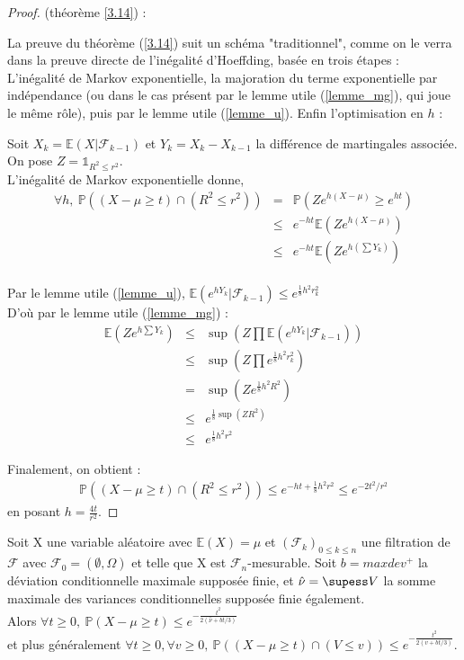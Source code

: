 \begin{proof} (théorème \ref{3.14}) :

La preuve du théorème (\ref{3.14}) suit un schéma "traditionnel", comme on le verra dans la preuve directe de l'inégalité d'Hoeffding, basée en trois étapes : L'inégalité de Markov exponentielle, la majoration du terme exponentielle par indépendance (ou dans le cas présent par le lemme utile (\ref{lemme_mg}), qui joue le même rôle), puis par le lemme utile (\ref{lemme_u}). Enfin l'optimisation en $h$ : 

Soit $X_k=\mathbb{E}(X|\mathcal{F}_{k-1})$ et $Y_k=X_k-X_{k-1}$ la différence de martingales associée.
On pose $  Z=\mathds{1}_{R^2 \leq r^2}  $. \\
L'inégalité de Markov exponentielle donne,
 \begin{eqnarray*} \forall h, ~
\mathbb{P}((X-\mu \geq t)\cap(R^2 \leq r^2)) 
 &=& \mathbb{P}(Ze^{h(X-\mu)} \geq e^{ht})\\
 &\leq& e^{-ht}\mathbb{E}(Ze^{h(X-\mu)})\\
 &\leq& e^{-ht}\mathbb{E}(Ze^{h(\sum Y_k)}) 
 \end{eqnarray*}
\\ 

Par le lemme utile (\ref{lemme_u}), 
$ \mathbb{E}(e^{hY_k}|\mathcal{F}_{k-1}) \leq e^{\frac{1}{8}h^2r_k^2}$ \\
D'où par le lemme utile (\ref{lemme_mg})  :
\begin{eqnarray*}
 \mathbb{E}(Ze^{h\sum Y_k}) &\leq& \sup(Z \prod \mathbb{E}(e^{hY_k}|\mathcal{F}_{k-1}))\\
& \leq & \sup(Z \prod e^{\frac{1}{8}h^2 r_k^2})\\
&=&  \sup(Z e^{\frac{1}{8}h^2R^2})\\
&\leq& e^{\frac{1}{8}\sup(ZR^2)}\\
&\leq& e^{\frac{1}{8}h^2r^2}
\end{eqnarray*}

Finalement, on obtient :
 \begin{eqnarray*}
 \mathbb{P}((X-\mu \geq t)\cap(R^2 \leq r^2)) \leq e^{-ht+\frac{1}{8}h^2r^2} \leq e^{-2t^2/r^2}
 \end{eqnarray*} 
en posant $h=\frac{4t}{r^2}$.

\end{proof}

\begin{theorem}
\label{3.15}
Soit X une variable aléatoire avec $\mathbb{E}(X)=\mu$ et $(\mathcal{F}_k)_{0\leq k \leq n}$ une filtration de $\mathcal{F}$ avec $ \mathcal{F}_0 =  (\emptyset , \Omega) $ et telle que X est $\mathcal{F}_n$-mesurable.
Soit $b=maxdev^+$ la déviation conditionnelle maximale supposée finie, et $\hat\nu=\supess V$ la somme maximale des variances conditionnelles supposée finie également. \\
Alors $\forall t \geq 0,~ \mathbb{P}(X-\mu \geq t) \leq e^{-\frac{t^2}{2(\hat\nu+bt/3)}}$\\
et plus généralement $\forall t \geq 0, \forall v \geq 0,~ \mathbb{P}((X-\mu \geq t)\cap(V \leq v)) \leq e^{-\frac{t^2}{2(v+bt/3)}}$.

\end{theorem}

